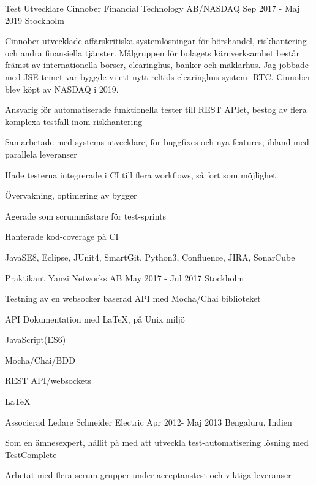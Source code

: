 \documentclass[12pt, a4paper]{awesome-cv}
\begin{document}
\begin{cventries}
    \cventry
      {Test Utvecklare}
      {Cinnober Financial Technology AB/NASDAQ}
      {Sep 2017 - Maj 2019}
      {Stockholm}
      {
        \begin{cvparagraph}
            Cinnober utvecklade affärskritiska systemlösningar för börshandel, riskhantering och andra 
            finansiella tjänster. Målgruppen för bolagets kärnverksamhet består främst av internationella börser, 
            clearinghus, banker och mäklarhus. Jag jobbade med JSE temet 
            var byggde vi ett nytt reltids clearinghus system- RTC. Cinnober blev köpt av NASDAQ i 2019. 
        \end{cvparagraph}
        \begin{cvitems}
          \item Ansvarig för automatiserade funktionella tester till REST APIet, bestog av flera komplexa testfall inom riskhantering
          \item Samarbetade med systems utvecklare, för buggfixes och nya features, ibland med parallela leveranser 
          \item Hade testerna integrerade i CI till flera workflows, så fort som möjlighet 
          \item Övervakning, optimering av bygger
          \item Agerade som scrummästare för test-sprints
          \item Hanterade kod-coverage på CI 
          \item JavaSE8, Eclipse, JUnit4, SmartGit, Python3, Confluence, JIRA, SonarCube
        \end{cvitems}
      }

    \cventry
      {Praktikant}
      {Yanzi Networks AB}
      {May 2017 - Jul 2017}
      {Stockholm}
      {
        \begin{cvitems}
          \item Testning av en websocker baserad API med Mocha/Chai biblioteket
          \item API Dokumentation med LaTeX, på Unix miljö
          \item JavaScript(ES6)
          \item Mocha/Chai/BDD
          \item REST API/websockets
          \item LaTeX
          \end{cvitems}
      }


    \cventry
      {Associerad Ledare}
      {Schneider Electric}
      {Apr 2012- Maj 2013}
      {Bengaluru, Indien}
      {
        \begin{cvitems}
          \item Som en ämnesexpert, hållit på med att utveckla test-automatisering lösning med TestComplete
          \item Arbetat med flera scrum grupper under acceptanstest och viktiga leveranser
          \end{cvitems}
      }


\end{cventries}
\end{document}
